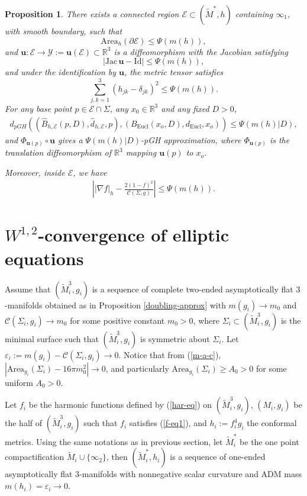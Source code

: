 \documentclass[letter]{amsart}
\newtheorem{prop}[thm]{Proposition}
\theoremstyle{definition}
\theoremstyle{remark}
\def\Area{\mathrm{Area}}
\begin{document}
\begin{prop}\label{DS-har}
	There exists a connected region $\mathcal{E}  \subset (\tilde{M}^*, h)$ containing $\infty_1$, with smooth boundary, such that 
$$
\mathrm{Area}_h(\partial \mathcal{E}) \leq \Psi (m(h) ),
$$ and $\mathbf{u}: \mathcal{E} \to \mathcal{Y}:= \mathbf{u}(\mathcal{E}) \subset \mathbb{R}^3$ is a diffeomorphism with the Jacobian satisfying 
$$
|\mathrm{Jac}\,\mathbf{u} - \mathrm{Id}| \leq \Psi (m(h) ),
$$
and under the identification by $\mathbf{u}$, the metric tensor satisfies
$$
\sum_{j,k=1}^{3}(h_{jk} - \delta_{jk})^2 \leq \Psi (m(h) ).
$$ 
For any base point $p \in \mathcal{E} \cap \Sigma $, any $x_0 \in \mathbb{R}^3$ and any fixed $D>0$, 
\begin{align*}
	d_{pGH}\left( (\hat{B}_{h, \mathcal{E}}(p, D), \hat{d}_{h, \mathcal{E}}, p), (B_{\mathrm{Eucl}}(x_o, D), d_{\mathrm{Eucl}}, x_o) \right) \leq \Psi (m(h)|D),
\end{align*}
and $\Phi _{\mathbf{u}(p)} \circ \mathbf{u}$ gives a $\Psi (m(h)|D)$-pGH approximation, where $\Phi _{\mathbf{u}(p)}$ is the translation diffeomorphism of $\mathbb{R}^3$ mapping $\mathbf{u}(p)$ to $x_o$. 

Moreover, inside $ \mathcal{E}$, we have
\begin{align}\label{grad-f}
\left| |\nabla f|_h -  \frac{2(1-f)^2}{\mathcal{C}(\Sigma ,g)} \right| \leq \Psi (m(h) ).	
\end{align}

\end{prop}


\section{$W^{1,2}$-convergence of elliptic equations}\label{conv-equations}
Assume that $(\tilde{M}_i^{3}, g_i)$ is a sequence of complete two-ended asymptotically flat $3$-manifolds obtained as in Proposition \ref{doubling-approx} with $m(g_i)\to m_0$ and $  \mathcal{C}(\Sigma_i, g_i)\to m_0$ for some positive constant $m_0>0$, where $\Sigma_i \subset (\tilde{M}_i^3, g_i)$ is the minimal surface such that $(\tilde{M}_i^3, g_i)$ is symmetric about $\Sigma_i$. Let $\varepsilon _i := m(g_i) - \mathcal{C}(\Sigma _i ,g_i) \to 0$. Notice that from (\ref{m-a-c}), $|\Area_{g_i}(\Sigma_i) - 16 \pi m_0^2| \to 0$, and particularly $ \Area_{g_i}(\Sigma_i) \geq A_0 >0$ for some uniform $A_0>0$.

Let $f_i$ be the harmonic functions defined by (\ref{har-eq}) on $(\tilde{M}^{3}_i, g_i)$, $(M_i, g_i)$ be the half of $(\tilde{M}_i^{3}, g_i)$ such that $f_i$ satisfies (\ref{f-eq1}), and $h_i:= f_i^{4}g_i$ the conformal metrics. Using the same notations as in previous section, let $\tilde{M}^*_i$ be the one point compactification $\tilde{M}_i \cup \{\infty_2\} $, then $(\tilde{M}^*_i, h_i)$ is a sequence of one-ended asymptotically flat $3$-manifolds with nonnegative scalar curvature and ADM mass $m(h_i)= \varepsilon _i \to 0$. 
\end{document}
